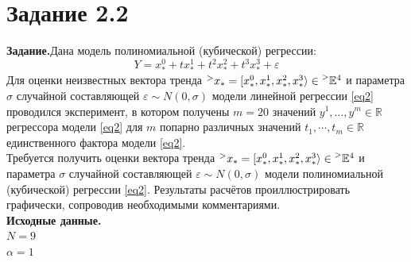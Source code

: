 \documentclass[14pt,a4paper]{scrartcl}
\begin{document}
\newpage
\section*{Задание 2.2}
\textbf{Задание.}Дана модель полиномиальной (кубической) регрессии:
\begin{equation}\label{eq2} 
	Y=x_{*}^{0}+t x_{*}^{1}+t^2 x_{*}^{2}+t^3 x_{*}^{3}+\varepsilon
\end{equation}
Для оценки неизвестных вектора тренда $\prescript{>}{}{x}_* = [x_*^0, x_*^1, x_*^2, x_*^3 \rangle \in \prescript{>}{}{\mathbb{E}}^{4}$ и параметра $\sigma$ случайной составляющей $\varepsilon \sim N(0, \sigma)$ модели линейной регрессии \ref{eq2} проводился эксперимент, в котором получены $m=20$ значений $y^1, \dots, y^m \in \mathbb{R}$ регрессора модели \ref{eq2} для $m$ попарно различных значений $t_1, \cdots, t_m \in \mathbb{R}$ единственного фактора модели \ref{eq2}.\\
Требуется получить оценки вектора тренда $\prescript{>}{}{x}_* = [x_*^0, x_*^1, x_*^2, x_*^3 \rangle \in \prescript{>}{}{\mathbb{E}}^{4}$ и параметра $\sigma$ случайной составляющей $\varepsilon \sim N(0, \sigma)$ модели полиномиальной (кубической) регрессии \ref{eq2}. Результаты расчётов проиллюстрировать графически, сопроводив необходимыми комментариями.\\
\textbf{Исходные данные.}\\
$N = 9$\\
$\alpha = 1$
\end{document}

